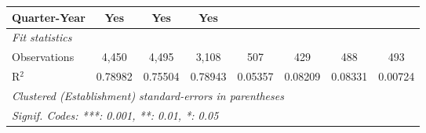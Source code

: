 \begin{tabular}{lccccccc}
   Quarter-Year         & Yes            & Yes                  & Yes               &                  &                 &                 & \\  
   \midrule
   \emph{Fit statistics}\\
   Observations         & 4,450          & 4,495                & 3,108             & 507              & 429             & 488             & 493\\  
   R$^2$                & 0.78982        & 0.75504              & 0.78943           & 0.05357          & 0.08209         & 0.08331         & 0.00724\\  
   \midrule \midrule
   \multicolumn{8}{l}{\emph{Clustered (Establishment) standard-errors in parentheses}}\\
   \multicolumn{8}{l}{\emph{Signif. Codes: ***: 0.001, **: 0.01, *: 0.05}}\\
\end{tabular}
\par\endgroup


